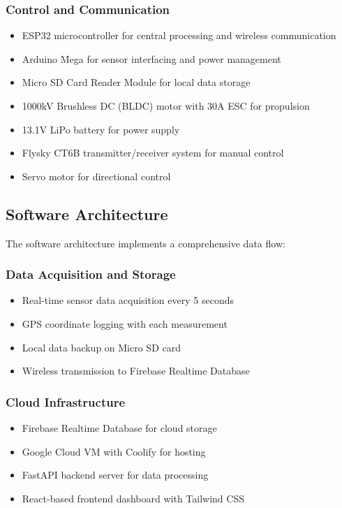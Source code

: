 \documentclass[conference]{IEEEtran}
\begin{document}
\subsubsection{Control and Communication}
\begin{itemize}
\item ESP32 microcontroller for central processing and wireless communication
\item Arduino Mega for sensor interfacing and power management
\item Micro SD Card Reader Module for local data storage
\item 1000kV Brushless DC (BLDC) motor with 30A ESC for propulsion
\item 13.1V LiPo battery for power supply
\item Flysky CT6B transmitter/receiver system for manual control
\item Servo motor for directional control
\end{itemize}

\subsection{Software Architecture}
The software architecture implements a comprehensive data flow:

\subsubsection{Data Acquisition and Storage}
\begin{itemize}
\item Real-time sensor data acquisition every 5 seconds
\item GPS coordinate logging with each measurement
\item Local data backup on Micro SD card
\item Wireless transmission to Firebase Realtime Database
\end{itemize}

\subsubsection{Cloud Infrastructure}
\begin{itemize}
\item Firebase Realtime Database for cloud storage
\item Google Cloud VM with Coolify for hosting
\item FastAPI backend server for data processing
\item React-based frontend dashboard with Tailwind CSS
\end{itemize}
\end{document}
